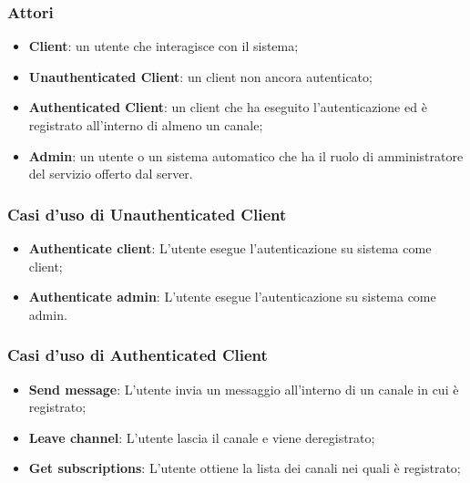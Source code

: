 		\subsubsection{Attori}
		\begin{itemize}
			\item \textbf{Client}: un utente che interagisce con il sistema;
			\item \textbf{Unauthenticated Client}: un client non ancora autenticato;
			\item \textbf{Authenticated Client}: un client che ha eseguito l'autenticazione ed è registrato all'interno di almeno un canale;
			\item \textbf{Admin}: un utente o un sistema automatico che ha il ruolo di amministratore del servizio offerto dal server.
		\end{itemize}

		\subsubsection{Casi d'uso di Unauthenticated Client}
		\begin{itemize}
			\item \textbf{Authenticate client}: L'utente esegue l'autenticazione su sistema come client;
			\item \textbf{Authenticate admin}: L'utente esegue l'autenticazione su sistema come admin.
		\end{itemize}

		\subsubsection{Casi d'uso di Authenticated Client}
		\begin{itemize}
			\item \textbf{Send message}: L'utente invia un messaggio all'interno di un canale in cui è registrato; 
			\item \textbf{Leave channel}: L'utente lascia il canale e viene deregistrato; 
			\item \textbf{Get subscriptions}: L'utente ottiene la lista dei canali nei quali è registrato; 
		\end{itemize}

